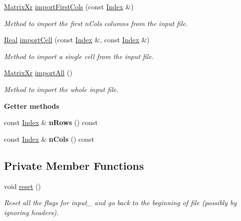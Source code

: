 \begin{DoxyCompactItemize}
\hyperlink{typedefs_8h_a81d507f5d0c665fb16966595c9520a55}{Matrix\-Xr} \hyperlink{classCsvParser_a98bb8475e310605adc492fdd942d4347}{import\-First\-Cols} (const \hyperlink{typedefs_8h_a2c726f8f32697958e9d6c2afecda531d}{Index} \&)
\begin{DoxyCompactList}\small\item\em Method to import the first {\itshape n\-Cols} columns from the input file. \end{DoxyCompactList}\item 
\hyperlink{typedefs_8h_a060b837c3b4486ee35317744156f3da2}{Real} \hyperlink{classCsvParser_ab55ce0b3da48508e006698bb639d90a2}{import\-Cell} (const \hyperlink{typedefs_8h_a2c726f8f32697958e9d6c2afecda531d}{Index} \&, const \hyperlink{typedefs_8h_a2c726f8f32697958e9d6c2afecda531d}{Index} \&)
\begin{DoxyCompactList}\small\item\em Method to import a single cell from the input file. \end{DoxyCompactList}\item 
\hyperlink{typedefs_8h_a81d507f5d0c665fb16966595c9520a55}{Matrix\-Xr} \hyperlink{classCsvParser_a603c6845e97f53719d61319e45c188a9}{import\-All} ()
\begin{DoxyCompactList}\small\item\em Method to import the whole input file. \end{DoxyCompactList}\end{DoxyCompactItemize}
\begin{Indent}{\bf Getter methods}\par
\begin{DoxyCompactItemize}
\item 
\hypertarget{classCsvParser_ac7ea83f67eb1df8778c2408eae5adfc3}{const \hyperlink{typedefs_8h_a2c726f8f32697958e9d6c2afecda531d}{Index} \& {\bfseries n\-Rows} () const }\label{classCsvParser_ac7ea83f67eb1df8778c2408eae5adfc3}

\item 
\hypertarget{classCsvParser_a883f9a29fb05649de4212acf808dbde4}{const \hyperlink{typedefs_8h_a2c726f8f32697958e9d6c2afecda531d}{Index} \& {\bfseries n\-Cols} () const }\label{classCsvParser_a883f9a29fb05649de4212acf808dbde4}

\end{DoxyCompactItemize}
\end{Indent}
\subsection*{Private Member Functions}
\begin{DoxyCompactItemize}
\item 
\hypertarget{classCsvParser_ad20897c5c8bd47f5d4005989bead0e55}{void \hyperlink{classCsvParser_ad20897c5c8bd47f5d4005989bead0e55}{reset} ()}\label{classCsvParser_ad20897c5c8bd47f5d4005989bead0e55}

\begin{DoxyCompactList}\small\item\em Reset all the flags for {\itshape input\-\_\-} and go back to the beginning of file (possibly by ignoring headers). \end{DoxyCompactList}\end{DoxyCompactItemize}
